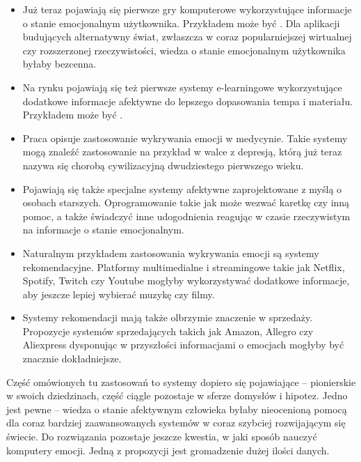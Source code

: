 \begin{itemize}	
	\item Już teraz pojawiają się pierwsze gry komputerowe wykorzystujące informacje o stanie emocjonalnym użytkownika. Przykładem może być \cite{nalepa2017affective}. Dla aplikacji budujących alternatywny świat, zwłaszcza w coraz popularniejszej wirtualnej czy rozszerzonej rzeczywistości, wiedza o stanie emocjonalnym użytkownika byłaby bezcenna.
	
	\item Na rynku pojawiają się też pierwsze systemy e-learningowe wykorzystujące dodatkowe informacje afektywne do lepszego dopasowania tempa i materiału. Przykładem może być \cite{feidakis2012design}.
	
	\item Praca \cite{hung2016predicting} opisuje zastosowanie wykrywania emocji w medycynie. Takie systemy mogą znaleźć zastosowanie na przykład w walce z depresją, którą już teraz nazywa się chorobą cywilizacyjną dwudziestego pierwszego wieku.
	
	\item Pojawiają się także specjalne systemy afektywne zaprojektowane z myślą o osobach starszych. Oprogramowanie takie jak \cite{yu2014emotion} może wezwać karetkę czy inną pomoc, a także świadczyć inne udogodnienia reagując w czasie rzeczywistym na informacje o stanie emocjonalnym.
	
	\item Naturalnym przykładem zastosowania wykrywania emocji są systemy rekomendacyjne. Platformy multimedialne i streamingowe takie jak Netflix, Spotify, Twitch czy Youtube mogłyby wykorzystywać dodatkowe informacje, aby jeszcze lepiej wybierać muzykę czy filmy.
	
	\item Systemy rekomendacji mają także olbrzymie znaczenie w sprzedaży. Propozycje systemów sprzedających takich jak Amazon, Allegro czy Aliexpress dysponując w przyszłości informacjami o emocjach mogłyby być znacznie dokładniejsze.
\end{itemize}

Część omówionych tu zastosowań to systemy dopiero się pojawiające -- pionierskie w swoich dziedzinach, część ciągle pozostaje w sferze domysłów i hipotez. Jedno jest pewne -- wiedza o stanie afektywnym człowieka byłaby nieocenioną pomocą dla coraz bardziej zaawansowanych systemów w coraz szybciej rozwijającym się świecie. Do rozwiązania pozostaje jeszcze kwestia, w jaki sposób nauczyć komputery emocji. Jedną z propozycji jest gromadzenie dużej ilości danych.

